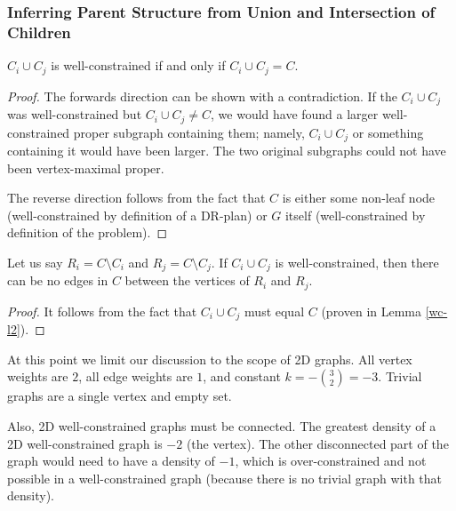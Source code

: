 \subsubsection{Inferring Parent Structure from Union and Intersection of Children}



\begin{lemma}\label{wc-l2}
$C_i\cup C_j$ is well-constrained if and only if $C_i\cup C_j = C$.
\end{lemma}

\begin{proof}
The forwards direction can be shown with a contradiction. If the $C_i\cup C_j$ was well-constrained but $C_i\cup C_j \neq C$, we would have found a larger well-constrained proper subgraph containing them; namely, $C_i\cup C_j$ or something containing it would have been larger. The two original subgraphs could not have been vertex-maximal proper.

The reverse direction follows from the fact that $C$ is either some non-leaf node (well-constrained by definition of a DR-plan) or $G$ itself (well-constrained by definition of the problem).
\end{proof}

\begin{corollary}\label{wc-c1}
Let us say $R_i=C\setminus C_i$ and $R_j=C\setminus C_j$. If $C_i\cup C_j$ is well-constrained, then there can be no edges in $C$ between the vertices of $R_i$ and $R_j$.
\end{corollary}

\begin{proof}
It follows from the fact that $C_i\cup C_j$ must equal $C$ (proven in Lemma \ref{wc-l2}).
\end{proof}



At this point we limit our discussion to the scope of 2D graphs. All vertex weights are $2$, all edge weights are $1$, and constant $k= -{{3}\choose{2}}=-3$. Trivial graphs are a single vertex and empty set.

Also, 2D well-constrained graphs must be connected.
The greatest density of a 2D well-constrained graph is $-2$ (the vertex). The other disconnected part of the graph would need to have a density of $-1$, which is over-constrained and not possible in a well-constrained graph (because there is no trivial graph with that density).

